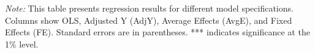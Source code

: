 \documentclass{article}
\begin{document}
{\parbox{\textwidth}{
    \footnotesize
    \textit{Note:} This table presents regression results for different model specifications.
    Columns show OLS, Adjusted Y (AdjY), Average Effects (AvgE), and Fixed Effects (FE).
    Standard errors are in parentheses.
    *** indicates significance at the 1\% level.
}}
\end{document}
